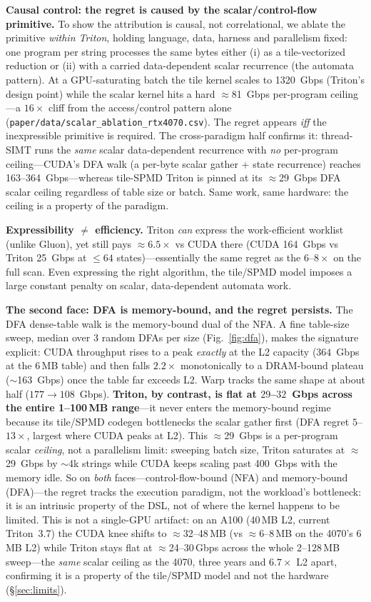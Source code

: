 \documentclass[conference]{IEEEtran}
\begin{document}
\textbf{Causal control: the regret is caused by the scalar/control-flow primitive.} To show the
attribution is causal, not correlational, we ablate the primitive \emph{within Triton}, holding
language, data, harness and parallelism fixed: one program per string processes the same bytes
either (i) as a tile-vectorized reduction or (ii) with a carried data-dependent scalar recurrence
(the automata pattern). At a GPU-saturating batch the tile kernel scales to 1320~Gbps (Triton's
design point) while the scalar kernel hits a hard $\approx$81~Gbps per-program ceiling---a
$16\times$ cliff from the access/control pattern alone (\texttt{paper/data/scalar\_ablation\_rtx4070.csv}).
The regret appears \emph{iff} the inexpressible primitive is required. The cross-paradigm half
confirms it: thread-SIMT runs the \emph{same} scalar data-dependent recurrence with \emph{no}
per-program ceiling---CUDA's DFA walk (a per-byte scalar gather + state recurrence) reaches
163--364~Gbps---whereas tile-SPMD Triton is pinned at its $\approx$29~Gbps DFA scalar ceiling
regardless of table size or batch. Same work, same hardware: the ceiling is a property of the
paradigm.

\textbf{Expressibility $\neq$ efficiency.} Triton \emph{can} express the work-efficient
worklist (unlike Gluon), yet still pays $\approx\!6.5\times$ vs CUDA there (CUDA 164~Gbps vs
Triton 25~Gbps at $\le 64$ states)---essentially the same regret as the $6$--$8\times$ on the
full scan. Even expressing the right algorithm, the tile/SPMD model imposes a large constant
penalty on scalar, data-dependent automata work.

\textbf{The second face: DFA is memory-bound, and the regret persists.} The DFA dense-table
walk is the memory-bound dual of the NFA. A fine table-size sweep, median over 3 random DFAs
per size (Fig.~\ref{fig:dfa}), makes the signature explicit: CUDA throughput rises to a peak
\emph{exactly} at the L2 capacity ($364$~Gbps at the 6\,MB table) and then falls $2.2\times$
monotonically to a DRAM-bound plateau ($\sim$163~Gbps) once the table far exceeds L2. Warp
tracks the same shape at about half ($177\!\rightarrow\!108$~Gbps). \textbf{Triton, by
contrast, is flat at $29$--$32$~Gbps across the entire 1--100\,MB range}---it never enters the
memory-bound regime because its tile/SPMD codegen bottlenecks the scalar gather first (DFA
regret $5$--$13\times$, largest where CUDA peaks at L2). This $\approx$29~Gbps is a per-program
scalar \emph{ceiling}, not a parallelism limit: sweeping batch size, Triton saturates at
$\approx$29~Gbps by $\sim$4k strings while CUDA keeps scaling past 400~Gbps with the memory
idle. So on \emph{both} faces---control-flow-bound (NFA) and memory-bound (DFA)---the
regret tracks the execution paradigm, not the workload's bottleneck: it is an intrinsic
property of the DSL, not of where the kernel happens to be limited. This is not a single-GPU
artifact: on an A100 (40\,MB L2, current Triton~3.7) the CUDA knee shifts to $\approx$32--48\,MB
(vs $\approx$6--8\,MB on the 4070's 6\,MB L2) while Triton stays flat at $\approx$24--30\,Gbps
across the whole 2--128\,MB sweep---the \emph{same} scalar ceiling as the 4070, three years and
$6.7\times$ L2 apart, confirming it is a property of the tile/SPMD model and not the hardware
(\S\ref{sec:limits}).
\end{document}
